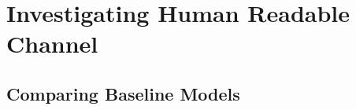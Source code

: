 










\section{Investigating Human Readable Channel} %
\label{sec:investigating_human_readable_channel}

\subsection{Comparing Baseline Models} %
\label{sub:comparing_baseline_models}

